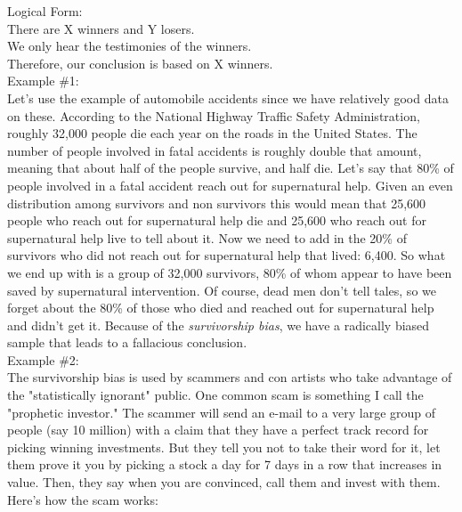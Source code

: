 \documentclass[a4paper,12pt,single,pdftex]{scrbook}
\begin{document}
    
      Logical Form:
    \\

    
      There are X winners and Y losers.
    \\

    
      We only hear the testimonies of the winners.
    \\

    
      Therefore, our conclusion is based on X winners.
    \\

    
      Example \#1:
    \\

    
      Let's use the example of automobile accidents since we have relatively good data on these. According to the National Highway Traffic Safety Administration, roughly 32,000 people die each year on the roads in the United States. The number of people involved in fatal accidents is roughly double that amount, meaning that about half of the people survive, and half die. Let's say that 80\% of people involved in a fatal accident reach out for supernatural help. Given an even distribution among survivors and non survivors this would mean that 25,600 people who reach out for supernatural help die and 25,600 who reach out for supernatural help live to tell about it. Now we need to add in the 20\% of survivors who did not reach out for supernatural help that lived: 6,400. So what we end up with is a group of 32,000 survivors, 80\% of whom appear to have been saved by supernatural intervention. Of course, dead men don't tell tales, so we forget about the 80\% of those who died and reached out for supernatural help and didn't get it. Because of the {\it survivorship bias}, we have a radically biased sample that leads to a fallacious conclusion.
    \\

    
      Example \#2:
    \\

    
      The survivorship bias is used by scammers and con artists who take advantage of the "statistically ignorant" public. One common scam is something I call the "prophetic investor." The scammer will send an e-mail to a very large group of people (say 10 million) with a claim that they have a perfect track record for picking winning investments. But they tell you not to take their word for it, let them prove it you by picking a stock a day for 7 days in a row that increases in value. Then, they say when you are convinced, call them and invest with them. Here's how the scam works:
    \\
\end{document}
